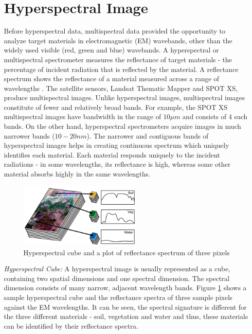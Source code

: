 \documentclass[12pt,twoside]{article}
\theoremstyle{plain}
\theoremstyle{definition}
\theoremstyle{remark}
\newcommand{\forceindent}{\leavevmode{\parindent=2em\indent}}
\begin{document}
\section{Hyperspectral Image}
\label{sec:HypTheo}
Before hyperspectral data, multispectral data provided the opportunity to analyze target materials in electromagnetic (EM) wavebands, other than the widely used visible (red, green and blue) wavebands. A hyperspectral or multispectral spectrometer measures the reflectance of target materials - the percentage of incident radiation that is reflected by the material. A reflectance spectrum shows the reflectance of a material measured across a range of wavelengths \cite{shippert2003introduction}. The satellite sensors, Landsat Thematic Mapper and SPOT XS,  produce multispectral images. Unlike hyperspectral images, multispectral images constitute of fewer  and relatively broad bands. For example, the SPOT XS multispectral images have bandwidth in the range of $10 \mu m$ and consists of 4 such bands. On the other hand, hyperspectral spectrometers acquire images in much narrower bands ($10-20nm$). The narrower and contiguous bands of hyperspectral images helps in creating continuous spectrum which uniquely identifies each material. Each material responds uniquely to the incident radiations - in some wavelengths, its reflectance is high, whereas some other material absorbs highly in the same wavelengths.\\
\begin{figure}
\includegraphics[width=0.55\textwidth]{src/Hyperspectral_cube.png}
\caption{Hyperspectral cube and a plot of reflectance spectrum of three pixels \cite{shippert2003introduction}}
\label{fig:hyp_cube}
\end{figure}
\forceindent \textit{Hyperspectral Cube:} A hyperspectral image is usually represented as a cube, containing two spatial dimensions and one spectral dimension. The spectral dimension consists of many narrow, adjacent wavelength bands. Figure \ref{fig:hyp_cube} shows a sample hyperspectral cube and the reflectance spectra of three sample pixels against the EM wavelengths. It can be seen, the spectral signature is different for the three different materials - soil, vegetation and water and thus, these materials can be identified by their reflectance spectra.
\end{document}
